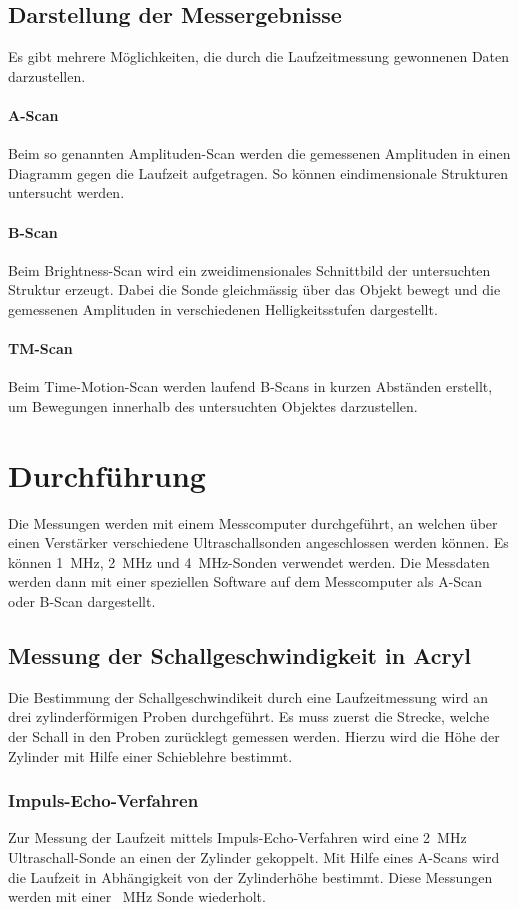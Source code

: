 \documentclass[11pt,ngerman,a4paper]{article}
\begin{document}
\subsection{Darstellung der Messergebnisse}
Es gibt mehrere M\"oglichkeiten, die durch die Laufzeitmessung gewonnenen Daten darzustellen.
\paragraph{A-Scan} Beim so genannten Amplituden-Scan werden die gemessenen Amplituden in einen Diagramm gegen die Laufzeit aufgetragen. So k\"onnen eindimensionale Strukturen untersucht werden. 
\paragraph{B-Scan}
Beim Brightness-Scan wird ein zweidimensionales Schnittbild der untersuchten Struktur erzeugt. Dabei die Sonde gleichm\"assig \"uber das Objekt bewegt und die gemessenen Amplituden in verschiedenen Helligkeitsstufen dargestellt.  
\paragraph{TM-Scan} Beim Time-Motion-Scan werden laufend B-Scans in kurzen Abst\"anden erstellt, um Bewegungen innerhalb des untersuchten Objektes darzustellen.

\section{Durchf\"uhrung }
Die Messungen werden mit einem Messcomputer durchgeführt, an welchen über einen Verstärker verschiedene Ultraschallsonden angeschlossen werden können. Es können \SI{1}{\mega\hertz}, \SI{2}{\mega  \hertz} und \SI{4}{\mega\hertz}-Sonden verwendet werden. Die Messdaten werden dann mit einer speziellen Software auf dem Messcomputer als A-Scan oder B-Scan dargestellt.
\subsection{Messung der Schallgeschwindigkeit in Acryl}
Die Bestimmung der Schallgeschwindikeit durch eine Laufzeitmessung wird an drei zylinderf\"ormigen Proben durchgef\"uhrt. Es muss zuerst die Strecke, welche der Schall in den Proben zur\"ucklegt gemessen werden. Hierzu wird die H\"ohe der Zylinder mit Hilfe einer Schieblehre bestimmt.  
\subsubsection{Impuls-Echo-Verfahren}
Zur Messung der Laufzeit mittels Impuls-Echo-Verfahren wird eine \SI{2}{\mega\hertz} Ultraschall-Sonde an einen der Zylinder gekoppelt. Mit Hilfe eines A-Scans wird die Laufzeit in Abh\"angigkeit von der Zylinderh\"ohe bestimmt. Diese Messungen werden mit einer \SI{}{\mega\hertz} Sonde wiederholt. 
\end{document}
